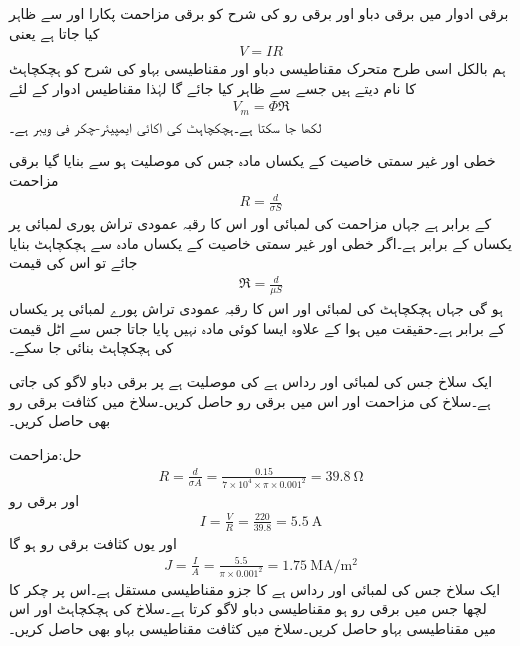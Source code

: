 برقی ادوار میں برقی دباو اور برقی رو کی شرح کو برقی مزاحمت پکارا اور  سے ظاہر کیا جاتا ہے یعنی
\begin{align}
V=I R
\end{align}
 ہم بالکل اسی طرح متحرک مقناطیسی دباو اور مقناطیسی بہاو کی شرح کو ہچکچاہٹ کا نام دیتے ہیں جسے  سے ظاہر کیا جائے گا لہٰذا مقناطیس ادوار کے لئے
\begin{align}
V_m=\Phi \Re
\end{align}
لکھا جا سکتا ہے۔ہچکچاہٹ کی اکائی ایمپیئر-چکر فی ویبر  ہے۔

خطی اور غیر سمتی خاصیت کے  یکساں مادہ جس کی موصلیت  ہو سے بنایا گیا برقی مزاحمت
\begin{align}
R=\frac{d}{\sigma S}
\end{align}
کے برابر ہے جہاں مزاحمت کی لمبائی  اور اس کا رقبہ عمودی تراش پوری لمبائی پر یکساں  کے برابر ہے۔اگر خطی اور غیر سمتی خاصیت کے یکساں مادہ سے ہچکچاہٹ بنایا جائے تو اس کی قیمت
\begin{align}
\Re=\frac{d}{\mu S}
\end{align}
ہو گی جہاں ہچکچاہٹ کی لمبائی  اور اس کا رقبہ عمودی تراش پورے لمبائی پر یکساں  کے برابر ہے۔حقیقت میں ہوا کے علاوہ ایسا کوئی مادہ نہیں پایا جاتا جس سے اٹل قیمت کی ہچکچاہٹ بنائی جا سکے۔

ایک سلاخ جس کی لمبائی  اور رداس  ہے کی موصلیت  ہے پر  برقی دباو لاگو کی جاتی ہے۔سلاخ کی مزاحمت اور اس میں برقی رو حاصل کریں۔سلاخ میں کثافت برقی رو بھی حاصل کریں۔

حل:مزاحمت
\begin{align*}
R=\frac{d}{\sigma A}=\frac{0.15}{7 \times 10^4 \times \pi \times 0.001^2}=\SI{39.8}{\ohm}
\end{align*}
اور برقی رو
\begin{align*}
I=\frac{V}{R}=\frac{220}{39.8}=\SI{5.5}{\ampere}
\end{align*}
اور یوں کثافت برقی رو ہو گا
\begin{align*}
J=\frac{I}{A}=\frac{5.5}{\pi\times 0.001^2}=\SI{1.75}{\mega \ampere \per \meter \squared}
\end{align*}
ایک سلاخ جس کی لمبائی  اور رداس  ہے کا جزو مقناطیسی مستقل  ہے۔اس پر  چکر کا لچھا جس میں  برقی رو ہو مقناطیسی دباو لاگو کرتا ہے۔سلاخ کی ہچکچاہٹ اور اس میں مقناطیسی بہاو حاصل کریں۔سلاخ میں کثافت مقناطیسی بہاو بھی حاصل کریں۔

